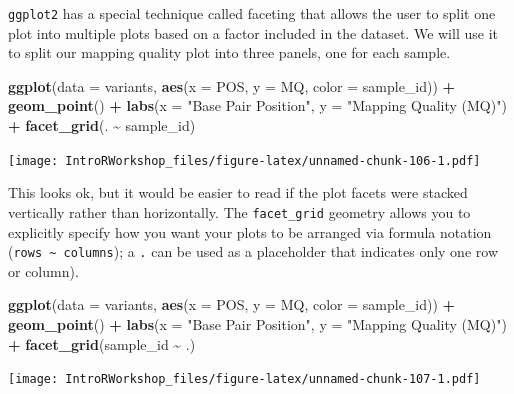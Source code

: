 \documentclass[
]{book}
\newenvironment{Shaded}{\begin{snugshade}}{\end{snugshade}}
\newcommand{\AttributeTok}[1]{\textcolor[rgb]{0.13,0.29,0.53}{#1}}
\newcommand{\FunctionTok}[1]{\textcolor[rgb]{0.13,0.29,0.53}{\textbf{#1}}}
\newcommand{\NormalTok}[1]{#1}
\newcommand{\SpecialCharTok}[1]{\textcolor[rgb]{0.81,0.36,0.00}{\textbf{#1}}}
\newcommand{\StringTok}[1]{\textcolor[rgb]{0.31,0.60,0.02}{#1}}
\begin{document}
\texttt{ggplot2} has a special technique called faceting that allows the user to split one plot into multiple plots based on a factor included in the dataset. We will use it to split our mapping quality plot into three panels, one for each sample.

\begin{Shaded}
\begin{Highlighting}[]
\FunctionTok{ggplot}\NormalTok{(}\AttributeTok{data =}\NormalTok{ variants, }\FunctionTok{aes}\NormalTok{(}\AttributeTok{x =}\NormalTok{ POS, }\AttributeTok{y =}\NormalTok{ MQ, }\AttributeTok{color =}\NormalTok{ sample\_id)) }\SpecialCharTok{+}
 \FunctionTok{geom\_point}\NormalTok{() }\SpecialCharTok{+}
 \FunctionTok{labs}\NormalTok{(}\AttributeTok{x =} \StringTok{"Base Pair Position"}\NormalTok{,}
      \AttributeTok{y =} \StringTok{"Mapping Quality (MQ)"}\NormalTok{) }\SpecialCharTok{+}
 \FunctionTok{facet\_grid}\NormalTok{(. }\SpecialCharTok{\textasciitilde{}}\NormalTok{ sample\_id)}
\end{Highlighting}
\end{Shaded}

\texttt{[image: IntroRWorkshop\_files/figure-latex/unnamed-chunk-106-1.pdf]}

This looks ok, but it would be easier to read if the plot facets were stacked vertically rather than horizontally. The \texttt{facet\_grid} geometry allows you to explicitly specify how you want your plots to be arranged via formula notation (\texttt{rows\ \textasciitilde{}\ columns}); a \texttt{.} can be used as a placeholder that indicates only one row or column).

\begin{Shaded}
\begin{Highlighting}[]
\FunctionTok{ggplot}\NormalTok{(}\AttributeTok{data =}\NormalTok{ variants, }\FunctionTok{aes}\NormalTok{(}\AttributeTok{x =}\NormalTok{ POS, }\AttributeTok{y =}\NormalTok{ MQ, }\AttributeTok{color =}\NormalTok{ sample\_id)) }\SpecialCharTok{+}
 \FunctionTok{geom\_point}\NormalTok{() }\SpecialCharTok{+}
 \FunctionTok{labs}\NormalTok{(}\AttributeTok{x =} \StringTok{"Base Pair Position"}\NormalTok{,}
      \AttributeTok{y =} \StringTok{"Mapping Quality (MQ)"}\NormalTok{) }\SpecialCharTok{+}
 \FunctionTok{facet\_grid}\NormalTok{(sample\_id }\SpecialCharTok{\textasciitilde{}}\NormalTok{ .)}
\end{Highlighting}
\end{Shaded}

\texttt{[image: IntroRWorkshop\_files/figure-latex/unnamed-chunk-107-1.pdf]}
\end{document}
